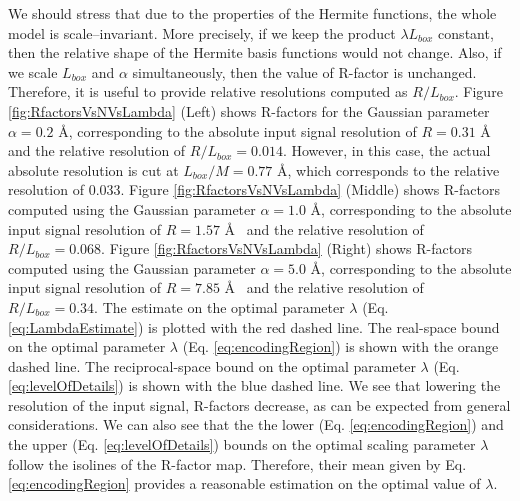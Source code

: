 %
We should stress that due to the properties of the Hermite functions, 
the whole model is scale--invariant. More precisely, if we keep the product $\lambda L_{box}$ constant, then the relative shape of the Hermite basis functions would not change. Also, if we scale $L_{box}$ and $\alpha$ simultaneously, then the value of R-factor is unchanged. 
%
Therefore, it is useful to provide relative resolutions computed as  $R/L_{box}$.
%
Figure \ref{fig:RfactorsVsNVsLambda} (Left) shows R-factors for the Gaussian parameter $\alpha=0.2$ \AA, corresponding to the absolute input signal resolution of $R=0.31$ \AA~ and the relative resolution of  $R/L_{box}=0.014$. However, in this case, the actual absolute resolution is cut at $L_{box}/M=0.77$ \AA, which corresponds to the relative resolution of 0.033.
%
Figure \ref{fig:RfactorsVsNVsLambda}  (Middle) shows R-factors computed using the Gaussian parameter $\alpha=1.0$ \AA, corresponding to the absolute input signal resolution of $R=1.57$ \AA~ and the relative resolution of  $R/L_{box}=0.068$.
Figure \ref{fig:RfactorsVsNVsLambda} (Right) shows R-factors computed using the Gaussian parameter $\alpha=5.0$ \AA, corresponding to the absolute input signal resolution of $R=7.85$ \AA~ and the relative resolution of  $R/L_{box}=0.34$.
%
The estimate on the optimal parameter $\lambda$ (Eq. \ref{eq:LambdaEstimate}) is plotted with the red dashed line. 
The real-space bound on the optimal parameter $\lambda$  (Eq. \ref{eq:encodingRegion}) is shown with the orange dashed line. The reciprocal-space bound on the optimal parameter $\lambda$  (Eq. \ref{eq:levelOfDetails}) is shown with the blue dashed line.
We see that lowering the resolution of the input signal, R-factors decrease, as can be expected from general considerations. We can also see that the the lower (Eq. \ref{eq:encodingRegion}) and the upper (Eq. \ref{eq:levelOfDetails}) bounds on the optimal scaling parameter $\lambda$ follow the isolines of the R-factor map.
Therefore, their mean given by Eq. \ref{eq:encodingRegion} provides a reasonable estimation on the optimal value of $\lambda$.


